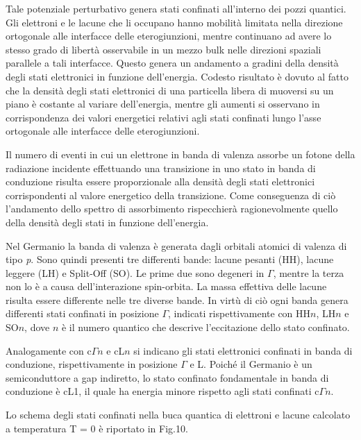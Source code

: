 \documentclass[journal]{IEEEtran}
\begin{document}
Tale potenziale perturbativo genera stati confinati all'interno dei pozzi quantici. Gli elettroni e le lacune che li occupano hanno mobilità limitata nella direzione ortogonale alle interfacce delle eterogiunzioni, mentre continuano ad avere lo stesso grado di libertà osservabile in un mezzo bulk nelle direzioni spaziali parallele a tali interfacce. Questo genera un andamento a gradini della densità degli stati elettronici in funzione dell'energia. Codesto risultato è dovuto al fatto che la densità degli stati elettronici di una particella libera di muoversi su un piano è costante al variare dell'energia, mentre gli aumenti si osservano in corrispondenza dei valori energetici relativi agli stati confinati lungo l'asse ortogonale alle interfacce delle eterogiunzioni.



Il numero di eventi in cui un elettrone in banda di valenza assorbe un fotone della radiazione incidente effettuando una transizione in uno stato in banda di conduzione risulta essere proporzionale alla densità degli stati elettronici corrispondenti al valore energetico della transizione.
Come conseguenza di ciò l’andamento dello spettro di assorbimento rispecchierà ragionevolmente quello della densità degli stati in funzione dell’energia.

Nel Germanio la banda di valenza è generata dagli orbitali atomici di valenza di tipo \textit{p}. Sono quindi presenti tre differenti bande: lacune pesanti (HH), lacune leggere (LH) e Split-Off (SO). Le prime due sono degeneri in $\Gamma$, mentre la terza non lo è a causa dell'interazione spin-orbita. La massa effettiva delle lacune risulta essere differente nelle tre diverse bande. In virtù di ciò ogni banda genera differenti stati confinati in posizione $\Gamma$, indicati rispettivamente con HH$\textit{n}$, LH$\textit{n}$ e SO$\textit{n}$, dove $\textit{n}$ è il numero quantico che descrive l'eccitazione dello stato confinato. 

Analogamente con c$\Gamma\textit{n}$ e cL$\textit{n}$ si indicano gli stati elettronici confinati in banda di conduzione, rispettivamente in posizione $\Gamma$ e L.  Poiché il Germanio è un semiconduttore a gap indiretto, lo stato confinato fondamentale in banda di conduzione è cL1, il quale ha energia minore rispetto agli stati confinati c$\Gamma\textit{n}$.

Lo schema degli stati confinati nella buca quantica di elettroni e lacune calcolato a temperatura T = 0 è riportato in Fig.10.
\end{document}
